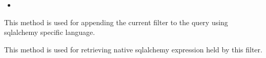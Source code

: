 \documentclass[letterpaper,10pt,english]{sphinxmanual}
\begin{document}
\begin{fulllineitems}
\begin{itemize}
\item {} 
{\hyperref[features/mvc:fantastico.mvc.models.model_filter_compound.ModelFilterOr]{}}

\end{itemize}

\begin{fulllineitems}
\label{features/mvc:fantastico.mvc.models.model_filter.ModelFilterAbstract.build}
This method is used for appending the current filter to the query using sqlalchemy specific language.

\end{fulllineitems}


\begin{fulllineitems}
\label{features/mvc:fantastico.mvc.models.model_filter.ModelFilterAbstract.get_expression}
This method is used for retrieving native sqlalchemy expression held by this filter.

\end{fulllineitems}


\end{fulllineitems}

\end{document}
